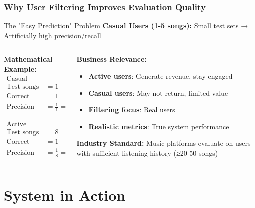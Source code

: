 \documentclass[11pt]{beamer}
\begin{document}
\begin{frame}
\frametitle{Why User Filtering Improves Evaluation Quality}
\begin{block}{The "Easy Prediction" Problem}
\textbf{Casual Users (1-5 songs):} Small test sets → Artificially high precision/recall
\end{block}

\begin{columns}
\begin{column}{0.5\textwidth}
\textbf{Mathematical Example:}
\small
\begin{align}
\text{Casual User:} \nonumber \\
\text{Test songs} &= 1 \nonumber \\
\text{Correct predictions} &= 1 \nonumber \\
\text{Precision} &= \frac{1}{1} = 100\% \nonumber
\end{align}

\begin{align}
\text{Active User:} \nonumber \\
\text{Test songs} &= 8 \nonumber \\
\text{Correct predictions} &= 1 \nonumber \\
\text{Precision} &= \frac{1}{8} = 12.5\% \nonumber
\end{align}
\end{column}
\begin{column}{0.5\textwidth}
\textbf{Business Relevance:}
\begin{itemize}
\item \textbf{Active users}: Generate revenue, stay engaged
\item \textbf{Casual users}: May not return, limited value
\item \textbf{Filtering focus}: Real users
\item \textbf{Realistic metrics}: True system performance
\end{itemize}

\textbf{Industry Standard:}
Music platforms evaluate on users with sufficient listening history (≥20-50 songs)
\end{column}
\end{columns}
\end{frame}

\section{System in Action}
\end{document}
